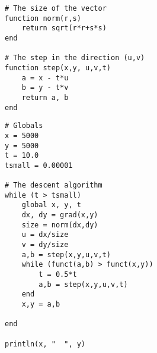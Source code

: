 \begin{verbatim}
# The size of the vector
function norm(r,s)
    return sqrt(r*r+s*s)
end

# The step in the direction (u,v)
function step(x,y, u,v,t)
    a = x - t*u
    b = y - t*v
    return a, b
end
\end{verbatim}

\begin{verbatim}
# Globals
x = 5000
y = 5000
t = 10.0
tsmall = 0.00001

# The descent algorithm
while (t > tsmall)
    global x, y, t
    dx, dy = grad(x,y)
    size = norm(dx,dy)
    u = dx/size
    v = dy/size
    a,b = step(x,y,u,v,t)
    while (funct(a,b) > funct(x,y))
        t = 0.5*t
        a,b = step(x,y,u,v,t)
    end
    x,y = a,b

end

println(x, "  ", y)
\end{verbatim}

\begin{Shaded}
\begin{Highlighting}[]
\OperatorTok{,}
\OperatorTok{=}\OperatorTok{\^{}} \OperatorTok{+}\OperatorTok{\^{}}\NormalTok{) }\OperatorTok{{-}} \NormalTok{)}\OperatorTok{\^{}}  \OperatorTok{+}
\OperatorTok{{-}}\NormalTok{)}\OperatorTok{\^{}} \OperatorTok{+}\OperatorTok{{-}}\NormalTok{)}\OperatorTok{\^{}}\NormalTok{) }\OperatorTok{{-}} \NormalTok{)}\OperatorTok{\^{}}  \OperatorTok{+}
\OperatorTok{{-}}\NormalTok{)}\OperatorTok{\^{}}  \OperatorTok{+}\OperatorTok{{-}}\NormalTok{)}\OperatorTok{\^{}}\NormalTok{) }\OperatorTok{{-}} \NormalTok{)}\OperatorTok{\^{}} \OperatorTok{+}
\OperatorTok{{-}}\NormalTok{)}\OperatorTok{\^{}} \OperatorTok{+}\OperatorTok{{-}}\NormalTok{)}\OperatorTok{\^{}}\NormalTok{) }\OperatorTok{{-}} \NormalTok{)}\OperatorTok{\^{}}
\end{Highlighting}
\end{Shaded}

